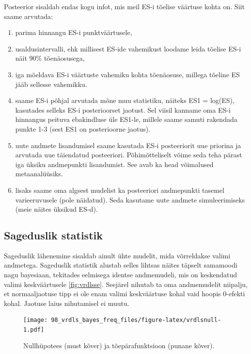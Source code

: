 \documentclass[]{book}
\begin{document}
Posteerior sisaldab endas kogu infot, mis meil ES-i tõelise väärtuse kohta on.
Siit saame arvutada:

\begin{enumerate}
\def\labelenumi{\arabic{enumi}.}
\item
  parima hinnangu ES-i punktväärtusele,
\item
  usaldusintervalli, ehk millisest ES-ide vahemikust loodame leida tõelise ES-i näit 90\% tõenäosusega,
\item
  iga mõeldava ES-i väärtuste vahemiku kohta tõenäosuse, millega tõeline ES jääb sellesse vahemikku.
\item
  saame ES-i põhjal arvutada mõne muu statistiku, näiteks ES1 = log(ES), kasutades selleks ES-i posterioorset jaotust. Sel viisil kanname oma ES-i hinnangus peituva ebakindluse üle ES1-le, millele saame samuti rakendada punkte 1-3 (sest ES1 on posterioorne jaotus).
\item
  uute andmete lisandumisel saame kasutada ES-i posteeriorit uue priorina ja arvutada uue täiendatud posteeriori. Põhimõtteliselt võime seda teha pärast iga üksiku andmepunkti lisandumist. See avab ka head võimalused metaanalüüsiks.
\item
  lisaks saame oma algsest mudelist ka posteeriori andmepunkti tasemel varieeruvusele (pole näidatud). Seda kasutame uute andmete simuleerimiseks (meie näites üksikud ES-d).
\end{enumerate}

\hypertarget{sageduslik-statistik}{%
\subsection*{Sageduslik statistik}\label{sageduslik-statistik}}

Sageduslik lähenemine sisaldab ainult ühte mudelit, mida võrreldakse valimi andmetega.
Sageduslik statistik alustab selles lihtsas näites täpselt samamoodi nagu bayesiaan, tekitades eelmisega identse andmemudeli, mis on keskendatud valimi keskväärtusele \ref{fig:vrdlsse}.
Seejärel nihutab ta oma andmemudelit niipalju, et normaaljaotuse tipp ei ole enam valimi keskväärtuse kohal vaid hoopis 0-efekti kohal. Jaotuse laius nihutamisel ei muutu.

\begin{figure}
\centering
\texttt{[image: 98\_vrdls\_bayes\_freq\_files/figure-latex/vrdlsnull-1.pdf]}
\caption{\label{fig:vrdlsnull}Nullhüpotees (must kõver) ja tõepärafunktsioon (punane kõver).}
\end{figure}
\end{document}
